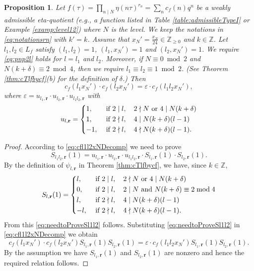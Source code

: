\documentclass[12pt]{amsart}
\numberwithin{equation}{section}
\theoremstyle{plain}
\newtheorem{prop}[thm]{Proposition}
\theoremstyle{definition}
\theoremstyle{remark}
\newcommand\numZ{\mathbb{Z}}
\newcommand\numgeq[2]{\mathbb{#1}_{\geq #2}}
\begin{document}
\begin{prop}
\label{prop:kZmultiplicativecfl}
Let $f(\tau)=\prod_{n\mid N}\eta(n\tau)^{r_n}=\sum_{n}c_f(n)q^n$ be a weakly admissible eta-quotient (e.g., a function listed in Table \ref{table:admissibleTypeI} or Example \ref{examp:level12}) where $N$ is the level. We keep the notations in \eqref{eq:notationsrn} with $k'=k$. Assume that $x_N'=\frac{x_N}{24}\in\numgeq{Z}{0}$ and $k\in\numZ$. Let $l_1,l_2\in L_f$ satisfy $(l_1,l_2)=1$, $(l_1,x_N')=1$ and $(l_2,x_N')=1$. We require \eqref{eq:pnp2l} holds for $l=l_1$ and $l_2$. Moreover, if $N\equiv0\bmod{2}$ and $N(k+\delta)\equiv2\bmod{4}$, then we require $l_1\equiv l_2\equiv1\bmod{2}$. (See Theorem \ref{thm:cTlfbycf}(b) for the definition of $\delta$.) Then
\begin{equation*}
c_f(l_1x_N')\cdot c_f(l_2x_N')=\varepsilon\cdot c_f(l_1l_2x_N'),
\end{equation*}
where $\varepsilon=u_{l_1,\mathbf{r}}\cdot u_{l_2,\mathbf{r}}\cdot u_{l_1l_2,\mathbf{r}}$ with
\begin{equation*}u_{l,\mathbf{r}}=
\begin{dcases}
1, &\text{ if   }2\mid l,\quad2\nmid N \text{ or }4\mid N(k+\delta)\\
1, &\text{ if   }2\nmid l,\quad4\mid N(k+\delta)(l-1)\\
-1, &\text{ if   }2\nmid l,\quad4\nmid N(k+\delta)(l-1).
\end{dcases}
\end{equation*}
\end{prop}
\begin{proof}
According to \eqref{eq:cfl1l2xNDecomp} we need to prove
\begin{equation}
\label{eq:needtoProveSl1l2}
S_{l_1l_2,\mathbf{r}}(1)=u_{l_1,\mathbf{r}}\cdot u_{l_2,\mathbf{r}}\cdot u_{l_1l_2,\mathbf{r}}\cdot S_{l_1,\mathbf{r}}(1)\cdot S_{l_2,\mathbf{r}}(1).
\end{equation}
By the definition of $\psi_{l,\mathbf{r}}$ in Theorem \ref{thm:cTlfbycf}, we have, since $k\in\numZ$,
\begin{equation*}S_{l,\mathbf{r}}(1)=
\begin{dcases}
l, &\text{ if   }2\mid l,\quad2\nmid N \text{ or }4\mid N(k+\delta)\\
0, &\text{ if   }2\mid l,\quad2\mid N\text{ and }  N(k+\delta)\equiv2\bmod{4}\\
l, &\text{ if   }2\nmid l,\quad4\mid N(k+\delta)(l-1)\\
-l, &\text{ if   }2\nmid l,\quad4\nmid N(k+\delta)(l-1).
\end{dcases}
\end{equation*}
From this \eqref{eq:needtoProveSl1l2} follows. Substituting \eqref{eq:needtoProveSl1l2} in \eqref{eq:cfl1l2xNDecomp} we obtain
$$
c_f(l_1x_N')\cdot c_f(l_2x_N')S_{l_1,\mathbf{r}}(1)S_{l_2,\mathbf{r}}(1)=\varepsilon\cdot c_f(l_1l_2x_N')S_{l_1,\mathbf{r}}(1)S_{l_2,\mathbf{r}}(1).
$$
By the assumption we have $S_{l_1,\mathbf{r}}(1)$ and $S_{l_2,\mathbf{r}}(1)$ are nonzero and hence the required relation follows.
\end{proof}
\end{document}
